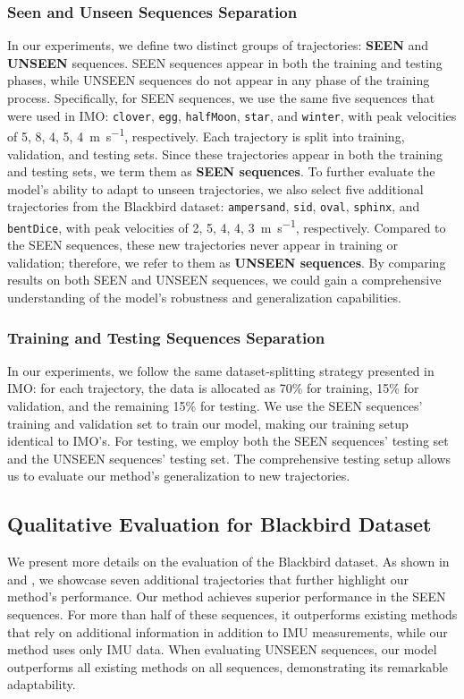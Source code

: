 \subsubsection{Seen and Unseen Sequences Separation}
\label{sec:airio:seenunseen}
In our experiments, we define two distinct groups of trajectories: \textbf{SEEN} and \textbf{UNSEEN} sequences. SEEN sequences appear in both the training and testing phases, while UNSEEN sequences do not appear in any phase of the training process. Specifically, for SEEN sequences, we use the same five sequences that were used in IMO: \texttt{clover}, \texttt{egg}, \texttt{halfMoon}, \texttt{star}, and \texttt{winter}, with peak velocities of 5, 8, 4, 5, 4~\unit{\metre\per\second}, respectively. Each trajectory is split into training, validation, and testing sets. Since these trajectories appear in both the training and testing sets, we term them as \textbf{SEEN sequences}. To further evaluate the model's ability to adapt to unseen trajectories, we also select five additional trajectories from the Blackbird dataset: \texttt{ampersand}, \texttt{sid}, \texttt{oval}, \texttt{sphinx}, and \texttt{bentDice}, with peak velocities of 2, 5, 4, 4, 3~\unit{\metre\per\second}, respectively. Compared to the SEEN sequences, these new trajectories never appear in training or validation; therefore, we refer to them as \textbf{UNSEEN sequences}. By comparing results on both SEEN and UNSEEN sequences, we could gain a comprehensive understanding of the model's robustness and generalization capabilities.

\subsubsection{Training and Testing Sequences Separation}
In our experiments, we follow the same dataset-splitting strategy presented in IMO: for each trajectory, the data is allocated as 70\% for training, 15\% for validation, and the remaining 15\% for testing. We use the SEEN sequences' training and validation set to train our model, making our training setup identical to IMO's. For testing, we employ both the SEEN sequences' testing set and the UNSEEN sequences' testing set. The comprehensive testing setup allows us to evaluate our method's generalization to new trajectories.



\subsection{Qualitative Evaluation for Blackbird Dataset}
\label{sec:airio:blackbird_qual}
We present more details on the evaluation of the Blackbird dataset. As shown in  and , we showcase seven additional trajectories that further highlight our method's performance. Our method achieves superior performance in the SEEN sequences. For more than half of these sequences, it outperforms existing methods that rely on additional information in addition to IMU measurements, while our method uses only IMU data. When evaluating UNSEEN sequences, our model outperforms all existing methods on all sequences, demonstrating its remarkable adaptability.




